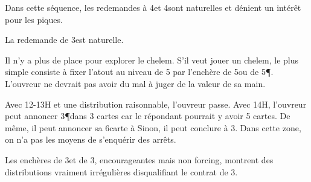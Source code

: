 \titre{2\C--2\P--3\P}
\begin{multicols}{2}

Dans cette séquence, les redemandes à 4\T et 4\K sont naturelles et dénient un intérêt pour les piques.

La redemande de 3\NT est naturelle.

Il n'y a plus de place pour explorer le chelem.  S'il veut jouer un chelem, le plus simple consiste à fixer l'atout au niveau de 5 par l'enchère de 5\C ou de 5\P. L'ouvreur ne devrait pas avoir du mal à juger de la valeur de sa main.

\end{multicols}

\titre{2\C--2\NT}

\begin{multicols}{2}

Avec 12-13H et une distribution raisonnable, l'ouvreur passe.
Avec 14H, l'ouvreur peut annoncer 3\P dans 3 cartes car le répondant pourrait y avoir 5 cartes. De même, il peut annoncer sa 6\ieme carte à \C
Sinon, il peut conclure à 3\NT. Dans cette zone, on n'a pas les moyens de s'enquérir des arrêts.

Les enchères de 3\T et de 3\K, encourageantes mais non forcing, montrent des distributions vraiment irrégulières disqualifiant le contrat de 3\NT.
\end{multicols}

